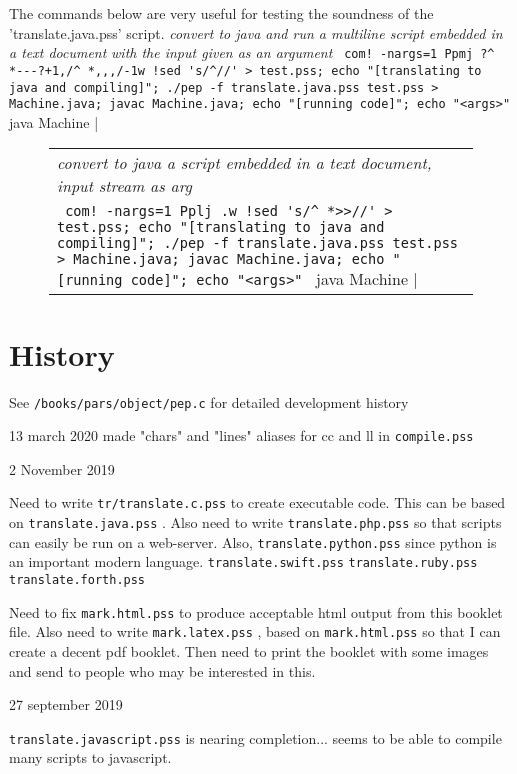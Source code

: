 \documentclass[a4paper,12pt]{article}
\begin{document}
  The commands below are very useful for testing the soundness of the
  'translate.java.pss' script.
 \emph{ convert to java and run a multiline script embedded in a text document }
 \emph{ with the input given as an argument  } 
 \verb| com! -nargs=1 Ppmj ?^ *---?+1,/^ *,,,/-1w !sed 's/^//' > test.pss; echo "[translating to java and compiling]"; ./pep -f translate.java.pss test.pss > Machine.java; javac Machine.java; echo "[running code]"; echo "<args>" | java Machine |

 \begin{figure}
 \begin{tabular}{ l }
 \emph{ convert to java a script embedded in a text document, input stream as arg } \\ 
 \verb| com! -nargs=1 Pplj .w !sed 's/^ *>>//' > test.pss; echo "[translating to java and compiling]"; ./pep -f translate.java.pss test.pss > Machine.java; javac Machine.java; echo "[running code]"; echo "<args>" | java Machine |
 \end{tabular} 
 \end{figure}


\section{History}

  See \texttt{/books/pars/object/pep.c} for detailed development history

  13 march 2020
    made "chars" and "lines" aliases for cc and ll in \texttt{compile.pss}

  2 November 2019

    Need to write \texttt{tr/translate.c.pss} to create executable code. This
    can be based on \texttt{translate.java.pss} . Also need to write
    \texttt{translate.php.pss} so that scripts can easily be run on a web-server.
    Also, \texttt{translate.python.pss} since python is an important modern
    language. \texttt{translate.swift.pss} \texttt{translate.ruby.pss} \texttt{translate.forth.pss}

    Need to fix \texttt{mark.html.pss} to produce acceptable html output from
    this booklet file. Also need to write \texttt{mark.latex.pss} , based
    on \texttt{mark.html.pss} so that I can create a decent pdf booklet. Then
    need to print the booklet with some images and send to people
    who may be interested in this.

  27 september 2019
   
    \texttt{translate.javascript.pss} is nearing completion... seems to be able
    to compile many scripts to javascript.
\end{document}
